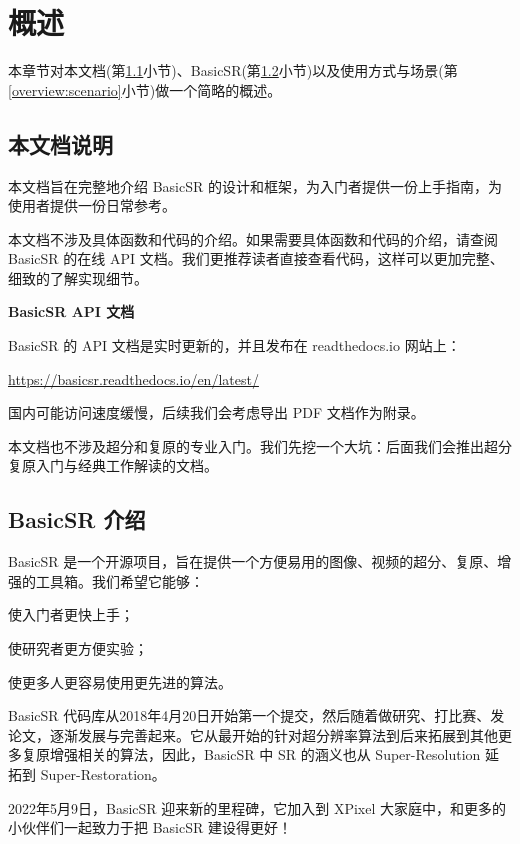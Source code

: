 \documentclass[../main.tex]{subfiles}
\begin{document}
\chapter{概述}
\vspace{-2cm}

本章节对本文档(第\ref{overview:docs-intro}小节)、BasicSR(第\ref{overview:basicsr-intro}小节)以及使用方式与场景(第\ref{overview:scenario}小节)做一个简略的概述。

\section{本文档说明}
\label{overview:docs-intro}
本文档旨在完整地介绍 BasicSR 的设计和框架，为入门者提供一份上手指南，为使用者提供一份日常参考。

本文档不涉及具体函数和代码的介绍。如果需要具体函数和代码的介绍，请查阅 BasicSR 的在线 API 文档。我们更推荐读者直接查看代码，这样可以更加完整、细致的了解实现细节。

\begin{hl} %
    \textbf{BasicSR API 文档}

    BasicSR 的 API 文档是实时更新的，并且发布在 readthedocs.io 网站上：

    \url{https://basicsr.readthedocs.io/en/latest/}

    国内可能访问速度缓慢，后续我们会考虑导出 PDF 文档作为附录。
\end{hl}

本文档也不涉及超分和复原的专业入门。我们先挖一个大坑：后面我们会推出超分复原入门与经典工作解读的文档。

\section{BasicSR 介绍}
\label{overview:basicsr-intro}
BasicSR 是一个开源项目，旨在提供一个方便易用的图像、视频的超分、复原、增强的工具箱。我们希望它能够：

\centerline{使入门者更快上手；}
\centerline{使研究者更方便实验；}
\centerline{使更多人更容易使用更先进的算法。}

BasicSR 代码库从2018年4月20日开始第一个提交，然后随着做研究、打比赛、发论文，逐渐发展与完善起来。它从最开始的针对超分辨率算法到后来拓展到其他更多复原增强相关的算法，因此，BasicSR 中 SR 的涵义也从 Super-Resolution 延拓到 Super-Restoration。

2022年5月9日，BasicSR 迎来新的里程碑，它加入到 XPixel 大家庭中，和更多的小伙伴们一起致力于把 BasicSR 建设得更好！
\end{document}
